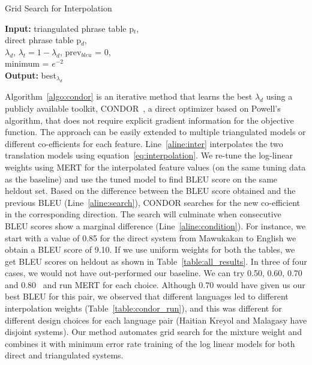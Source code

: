 \documentclass[11pt]{article}
\begin{document}
	\begin{algorithm}
		\caption{Grid Search for Interpolation}
		\label{algo:condor}
		\textbf{Input:} triangulated phrase table p$_{t}$, \\ direct phrase table p$_{d}$, \\
		$\lambda_{d}$, $\lambda_{t} = 1 - \lambda_{d}$, prev$_{bleu}$ = 0, \\
		minimum = $e ^{-2}$ \\
		\textbf{Output:} best$_{\lambda_{d}}$


		\begin{algorithmic}[1]
			 \label{aline:condition}
			 \label{aline:inter}
			 \label{aline:search}
			\ENDWHILE
		\end{algorithmic}
	\end{algorithm}

	Algorithm~\ref{algo:condor} is an iterative method that learns the best $\lambda_{d}$  using a publicly available toolkit, CONDOR~\cite{Berghen:05}, a direct optimizer based on Powell's algorithm, that does not require explicit gradient information for the objective function. The approach can be easily extended to multiple triangulated models or different co-efficients for each feature. Line~\ref{aline:inter} interpolates the two translation models using equation~\eqref{eq:interpolation}. We re-tune the log-linear weights using MERT for the interpolated feature values (on the same tuning data as the baseline) and use the tuned model to find BLEU score on the same heldout set. Based on the difference between the BLEU score obtained and the previous BLEU (Line~\ref{aline:search}), CONDOR searches for the new co-efficient in the corresponding direction. The search will culminate when consecutive BLEU scores show a marginal difference (Line~\ref{aline:condition}). For instance, we start with a value of 0.85 for the direct system from Mawukakan to English we obtain a BLEU score of 9.10.  If we use uniform weights for both the tables, we get BLEU scores on heldout as shown in Table~\ref{table:all_results}. In three of four cases, we would not have out-performed our baseline. We can try 0.50, 0.60, 0.70 and 0.80~\cite{Nakov:12} and run MERT for each choice. Although 0.70 would have given us our best BLEU for this pair, we observed that different languages led to different interpolation weights (Table~\ref{table:condor_run}), and this was different for different design choices for each language pair (Haitian Kreyol and Malagasy have disjoint systems). Our method automates grid search for the mixture weight and combines it with minimum error rate training of the log linear models for both direct and triangulated systems.
\end{document}
